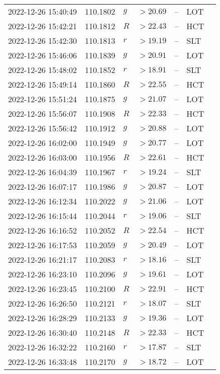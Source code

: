 \documentclass{nature_plusfigure}
\begin{document}
\begin{supplement}
\begin{center}
\begin{longtable}{lllllll}
2022-12-26 15:40:49 & 110.1802 & $g$ & $>20.69$ & -- & LOT &  \\ 
2022-12-26 15:42:21 & 110.1812 & $R$ & $>22.43$ & -- & HCT &  \\ 
2022-12-26 15:42:30 & 110.1813 & $r$ & $>19.19$ & -- & SLT &  \\ 
2022-12-26 15:46:06 & 110.1839 & $g$ & $>20.91$ & -- & LOT &  \\ 
2022-12-26 15:48:02 & 110.1852 & $r$ & $>18.91$ & -- & SLT &  \\ 
2022-12-26 15:49:14 & 110.1860 & $R$ & $>22.55$ & -- & HCT &  \\ 
2022-12-26 15:51:24 & 110.1875 & $g$ & $>21.07$ & -- & LOT &  \\ 
2022-12-26 15:56:07 & 110.1908 & $R$ & $>22.33$ & -- & HCT &  \\ 
2022-12-26 15:56:42 & 110.1912 & $g$ & $>20.88$ & -- & LOT &  \\ 
2022-12-26 16:02:00 & 110.1949 & $g$ & $>20.77$ & -- & LOT &  \\ 
2022-12-26 16:03:00 & 110.1956 & $R$ & $>22.61$ & -- & HCT &  \\ 
2022-12-26 16:04:39 & 110.1967 & $r$ & $>19.24$ & -- & SLT &  \\ 
2022-12-26 16:07:17 & 110.1986 & $g$ & $>20.87$ & -- & LOT &  \\ 
2022-12-26 16:12:34 & 110.2022 & $g$ & $>21.06$ & -- & LOT &  \\ 
2022-12-26 16:15:44 & 110.2044 & $r$ & $>19.06$ & -- & SLT &  \\ 
2022-12-26 16:16:52 & 110.2052 & $R$ & $>22.54$ & -- & HCT &  \\ 
2022-12-26 16:17:53 & 110.2059 & $g$ & $>20.49$ & -- & LOT &  \\ 
2022-12-26 16:21:17 & 110.2083 & $r$ & $>18.16$ & -- & SLT &  \\ 
2022-12-26 16:23:10 & 110.2096 & $g$ & $>19.61$ & -- & LOT &  \\ 
2022-12-26 16:23:45 & 110.2100 & $R$ & $>22.91$ & -- & HCT &  \\ 
2022-12-26 16:26:50 & 110.2121 & $r$ & $>18.07$ & -- & SLT &  \\ 
2022-12-26 16:28:29 & 110.2133 & $g$ & $>19.36$ & -- & LOT &  \\ 
2022-12-26 16:30:40 & 110.2148 & $R$ & $>22.33$ & -- & HCT &  \\ 
2022-12-26 16:32:22 & 110.2160 & $r$ & $>17.87$ & -- & SLT &  \\ 
2022-12-26 16:33:48 & 110.2170 & $g$ & $>18.72$ & -- & LOT &  \\ 

\end{longtable}
\end{center}
\end{supplement}
\end{document}
